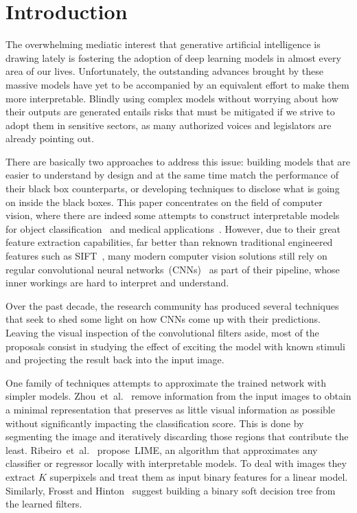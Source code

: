 \documentclass[preprint,12pt]{elsarticle}
\begin{document}

\section{Introduction}
\label{sec:introduction}
The overwhelming mediatic interest that generative artificial intelligence is drawing lately is fostering the adoption of deep learning models in almost every area of our lives. Unfortunately, the outstanding advances brought by these massive models have yet to be accompanied by an equivalent effort to make them more interpretable. Blindly using complex models without worrying about how their outputs are generated entails risks that must be mitigated if we strive to adopt them in sensitive sectors, as many authorized voices and legislators are already pointing out. 

There are basically two approaches to address this issue: building models that are easier to understand by design and at the same time match the performance of their black box counterparts, or developing techniques to disclose what is going on inside the black boxes. This paper concentrates on the field of computer vision, where there are indeed some attempts to construct interpretable models for object classification~\cite{Zhang2021} and medical applications~\cite{Singh2022}. However, due to their great feature extraction capabilities, far better than reknown traditional engineered features such as SIFT~\cite{Lowe2004}, many modern computer vision solutions still rely on regular convolutional neural networks~(CNNs)~\cite{LeCun1998} as part of their pipeline, whose inner workings are hard to interpret and understand. 

Over the past decade, the research community has produced several techniques that seek to shed some light on how CNNs come up with their predictions. Leaving the visual inspection of the convolutional filters aside, most of the proposals consist in studying the effect of exciting the model with known stimuli and projecting the result back into the input image. 

One family of techniques attempts to approximate the trained network with simpler models. Zhou~et~al.~\cite{Zhou2015} remove information from the input images to obtain a minimal representation that preserves as little visual information as possible without significantly impacting the classification score. This is done by segmenting the image and iteratively discarding those regions that contribute the least. Ribeiro~et~al.~\cite{Ribeiro2016} propose~LIME, an algorithm that approximates any classifier or regressor locally with interpretable models. To deal with images they extract $K$ superpixels and treat them as input binary features for a linear model. Similarly, Frosst and Hinton~\cite{Frosst2017} suggest building a binary soft decision tree from the learned filters.
\end{document}
